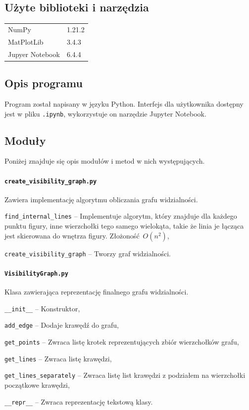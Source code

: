 \documentclass[12pt]{article}
\let\tempone\itemize
\let\temptwo\enditemize
\renewenvironment{itemize}{\tempone\setlength{\itemsep}{0cm}}{\temptwo}
\begin{document}
	\subsection{Użyte biblioteki i narzędzia}
		\begin{tabular}{l|l}
			NumPy&1.21.2\\
			MatPlotLib&3.4.3\\
			Jupyer Notebook&6.4.4
		\end{tabular}
	
	\subsection{Opis programu}
		Program został napisany w języku Python. Interfejs dla użytkownika dostępny jest w pliku \lstinline|.ipynb|, wykorzystuje on narzędzie Jupyter Notebook.
	
	
	\subsection{Moduły}
		Poniżej znajduje się opis modułów i metod w nich występujących.
	
		\paragraph{\lstinline|create_visibility_graph.py|}
		Zawiera implementację algorytmu obliczania grafu widzialności.
		\begin{itemize}
			\item \lstinline|find_internal_lines| -- Implementuje algorytm, który znajduje dla każdego punktu figury, inne wierzchołki tego samego wielokąta, takie że linia je łącząca jest skierowana do wnętrza figury. Złożoność $ O(n^2) $,
			\item \lstinline|create_visibility_graph| -- Tworzy graf  widzialności.
		\end{itemize}
	
	\paragraph{\lstinline|VisibilityGraph.py|}
		Klasa zawierająca reprezentację finalnego grafu widzialności.
		\begin{itemize}
			\item \lstinline|__init__| -- Konstruktor,
			\item \lstinline|add_edge| -- Dodaje krawędź do grafu,
			\item \lstinline|get_points| -- Zwraca listę krotek reprezentujących zbiór wierzchołków grafu,
			\item \lstinline|get_lines| -- Zwraca listę krawędzi,
			\item \lstinline|get_lines_separately| -- Zwraca listę list krawędzi z podziałem na wierzchołki początkowe krawędzi,
			\item \lstinline|__repr__| -- Zwraca reprezentację tekstową klasy.
		\end{itemize}
	
\end{document}
